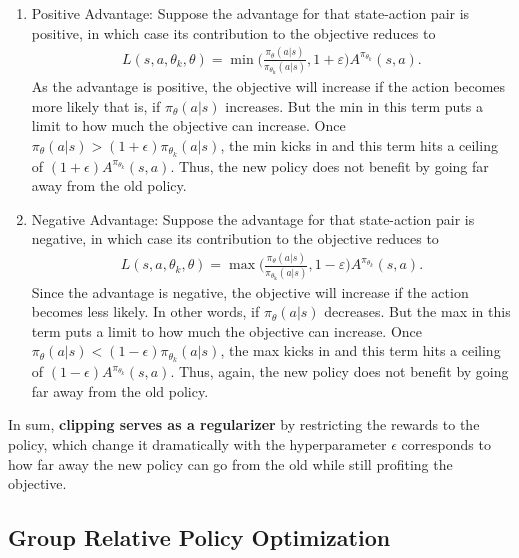 \begin{enumerate}
	\item Positive Advantage: Suppose the advantage for that state-action pair is positive, in which case its contribution to the objective reduces to
\begin{align}
	L(s, a, \theta_k, \theta) = \min \Bigg(\frac{\pi_{\theta}\left(a | s\right)}{\pi_{\theta_{\text {k}}}\left(a | s\right)}, 1+\varepsilon \Bigg) A^{\pi_{\theta_k}}(s,a).
	\label{eq:ppo_positive}
\end{align}
As the advantage is positive, the objective will increase if the action becomes more likely that is, if $\pi_{\theta}(a|s)$ increases. But the min in this term puts a limit to how much the objective can increase. Once $\pi_{\theta}(a|s) > (1+\epsilon) \pi_{\theta_k}(a|s)$, the min kicks in and this term hits a ceiling of $(1+\epsilon) A^{\pi_{\theta_k}}(s,a)$. Thus, the new policy does not benefit by going far away from the old policy.
\item Negative Advantage: Suppose the advantage for that state-action pair is negative, in which case its contribution to the objective reduces to
\begin{align}
	L(s, a, \theta_k, \theta) = \max \Bigg(\frac{\pi_{\theta}\left(a | s\right)}{\pi_{\theta_{\text {k}}}\left(a | s\right)}, 1-\varepsilon \Bigg) A^{\pi_{\theta_k}}(s,a).
	\label{eq:ppo_negative}
\end{align}
Since the advantage is negative, the objective will increase if the action becomes less likely. In other words, if $\pi_{\theta}(a|s)$ decreases. But the max in this term puts a limit to how much the objective can increase. Once $\pi_{\theta}(a|s) < (1-\epsilon) \pi_{\theta_k}(a|s)$, the max kicks in and this term hits a ceiling of $(1-\epsilon) A^{\pi_{\theta_k}}(s,a)$. Thus, again, the new policy does not benefit by going far away from the old policy.
\end{enumerate}
In sum, \textbf{clipping serves as a regularizer} by restricting the rewards to the policy, which change it dramatically with the hyperparameter $\epsilon$ corresponds to how far away the new policy can go from the old while still profiting the objective.

\subsection{Group Relative Policy Optimization}

